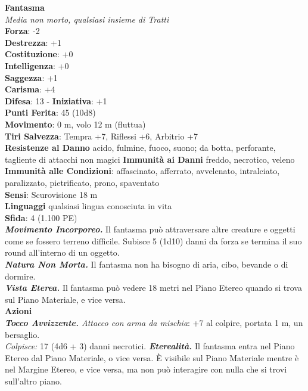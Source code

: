 \begin{multicols}{2}
\medskip\textbf{Fantasma}\\
\emph{Media non morto, qualsiasi insieme di Tratti}\\
\textbf{Forza}: -2\\
\textbf{Destrezza}: +1\\
\textbf{Costituzione}: +0\\
\textbf{Intelligenza}: +0\\
\textbf{Saggezza}: +1\\
\textbf{Carisma}: +4\\
\textbf{Difesa}: 13 - \textbf{Iniziativa}: +1\\
\textbf{Punti Ferita}: 45 (10d8)\\
\textbf{Movimento}: 0 m, volo 12 m (fluttua)\\
\textbf{Tiri Salvezza}: Tempra +7, Riflessi +6, Arbitrio +7\\
\textbf{Resistenze al Danno} acido, fulmine, fuoco, suono; da botta, perforante, tagliente di attacchi non magici
\textbf{Immunità ai Danni} freddo, necrotico, veleno\\
\textbf{Immunità alle Condizioni}: affascinato, afferrato, avvelenato, intralciato, paralizzato, pietrificato, prono, spaventato \\
\textbf{Sensi}: Scurovisione 18 m\\
\textbf{Linguaggi} qualsiasi lingua conosciuta in vita\\
\textbf{Sfida}: 4 (1.100 PE)\smallskip\\
\emph{\textbf{Movimento Incorporeo.}} Il fantasma può attraversare altre creature e oggetti come se fossero terreno difficile. Subisce 5 (1d10) danni da forza se termina il suo round all'interno di un oggetto.\\
\emph{\textbf{Natura Non Morta.}} Il fantasma non ha bisogno di aria, cibo, bevande o di dormire.\\
\emph{\textbf{Vista Eterea.}} Il fantasma può vedere 18 metri nel Piano  Etereo quando si trova sul Piano Materiale, e vice versa.\\
\smallskip\textbf{Azioni}\\
\emph{\textbf{Tocco Avvizzente.} Attacco con arma da mischia}: +7 al colpire, portata 1 m, un bersaglio.\\
\emph{Colpisce:} 17 (4d6 + 3) danni necrotici. 
\emph{\textbf{Eterealità.}} Il fantasma entra nel Piano Etereo dal Piano Materiale, o vice versa. È visibile sul Piano Materiale mentre è nel Margine Etereo, e vice versa, ma non può interagire con nulla che si trovi sull'altro piano.\\

\end{multicols}
